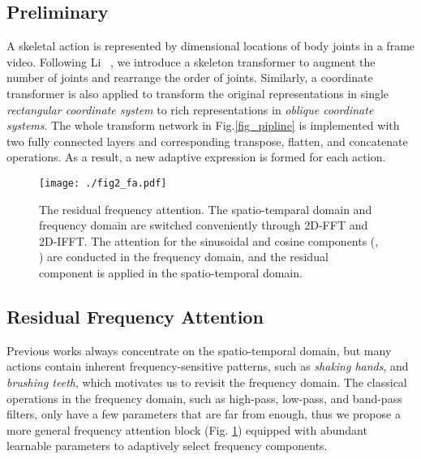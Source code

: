\documentclass{article}
\begin{document}
\subsection{Preliminary}
A skeletal action {\myfont} is represented by  dimensional locations of {\myfont} body joints in a {\myfont} frame video. Following Li \etal~\cite{DBLP:conf/icmcs/LiZXP17}, we introduce a skeleton transformer to augment the number of joints and rearrange the order of joints. Similarly, a coordinate transformer is also applied to transform the original representations in single \textit{rectangular coordinate system} to rich representations in {\myfont} \textit{oblique coordinate systems}. The whole transform network in Fig.\ref{fig_pipline} is implemented with two fully connected layers and corresponding transpose, flatten, and concatenate operations. As a result, a new adaptive expression {\myfont} is formed for each action. 

\begin{figure}[htb]
	\centering
	\texttt{[image: ./fig2\_fa.pdf]}
	\caption{The residual frequency attention. The spatio-temparal domain and frequency domain are switched conveniently through 2D-FFT and 2D-IFFT. The attention for the sinusoidal and cosine components (, ) are conducted in the frequency domain, and the residual component is applied in the spatio-temporal domain.}
	\label{fig2}
\end{figure}

\subsection{Residual Frequency Attention}
Previous works always concentrate on the spatio-temporal domain, but many actions contain inherent frequency-sensitive patterns, such as \textit{shaking hands}, and \textit{brushing teeth}, which motivates us to revisit the frequency domain. The classical operations in the frequency domain, such as high-pass, low-pass, and band-pass filters, only have a few parameters that are far from enough, thus we propose a more general frequency attention block (Fig. \ref{fig2}) equipped with abundant learnable parameters to adaptively select frequency components.
\end{document}
